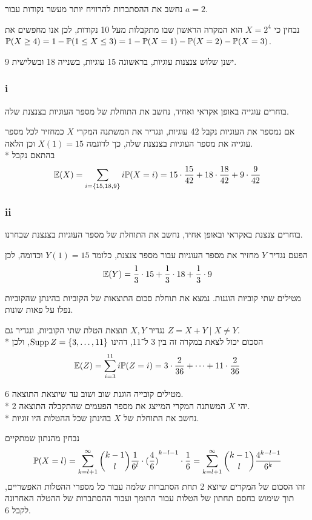 \subquestion{}
נחשב את ההסתברות להרוויח יותר מעשר נקודות עבור $a = 2$.
\begin{solution}
	נבחין כי $X = 2^4$ הוא המקרה הראשון שבו מתקבלות מעל 10 נקודות, לכן אנו מחפשים את $\mathbb{P}(X \ge 4) = 1 - \mathbb{P}(1 \le X \le 3) = 1 - \mathbb{P}(X = 1) - \mathbb{P}(X = 2) - \mathbb{P}(X = 3)$.
\end{solution}

\question{}
\subquestion{}
ישנן שלוש צנצנות עוגיות, בראשונה 15 עוגיות, בשנייה 18 ובשלישית 9.

\subsubsection{i}
בוחרים עוגייה באופן אקראי ואחיד, נחשב את התוחלת של מספר העוגיות בצנצנת שלה.
\begin{solution}
	אם נמספר את העוגיות נקבל 42 עוגיות, ונגדיר את המשתנה המקרי $X$ כמחזיר לכל מספר עוגייה את מספר העוגיות בצנצנת שלה, כך לדוגמה $X(1) = 15$ וכן הלאה. \\*
	בהתאם נקבל
	\[
		\mathbb{E}(X)
		= \sum_{i = \{15, 18, 9\}} i \mathbb{P}(X = i)
		= 15 \cdot \frac{15}{42} + 18 \cdot \frac{18}{42} + 9 \cdot \frac{9}{42}
	\]
\end{solution}

\subsubsection{ii}
בוחרים צנצנת באקראי ובאופן אחיד, נחשב את התוחלת של מספר העוגיות בצנצנת שבחרנו.
\begin{solution}
	הפעם נגדיר $Y$ מחזיר את מספר העוגיות עבור מספר צנצנת, כלומר $Y(1) = 15$ וכדומה, לכן
	\[
		\mathbb{E}(Y) = \frac{1}{3} \cdot 15 + \frac{1}{3} \cdot 18 + \frac{1}{3} \cdot 9
	\]
\end{solution}

\subquestion{}
מטילים שתי קוביות הוגנות.
נמצא את תוחלת סכום התוצאות של הקוביות בהינתן שהקוביות נפלו על פאות שונות.
\begin{solution}
	נגדיר $X, Y$ תוצאת הטלת שתי הקוביות, ונגדיר גם $Z = X + Y \mid X \ne Y$. \\*
	הסכום יכול לצאת במקרה זה בין 3 ל־11, דהינו $\operatorname{Supp} Z = \{3, \dots, 11\}$, ולכן
	\[
		\mathbb{E}(Z)
		= \sum_{i = 3}^{11} i \mathbb{P}(Z = i)
		= 3 \cdot \frac{2}{36} + \cdots + 11 \cdot \frac{2}{36}
	\]
\end{solution}

\subquestion{}
מטילים קובייה הוגנת שוב ושוב עד שיוצאת התוצאה 6. \\*
יהי $X$ המשתנה המקרי המייצג את מספר הפעמים שהתקבלה התוצאה 2. \\*
נחשב את התוחלת של $X$ בהינתן שכל ההטלות היו זוגיות.
\begin{solution}
	נבחין מהנתון שמתקיים
	\[
		\mathbb{P}(X = l)
		= \sum_{k = l + 1}^{\infty} \binom{k - 1}{l} \frac{1}{6^{l}} \cdot {(\frac{4}{6})}^{k - l - 1} \cdot \frac{1}{6}
		= \sum_{k = l + 1}^{\infty} \binom{k - 1}{l} \frac{4^{k - l - 1}}{6^k}
	\]
	זהו הסכום של המקרים שיוצא 2 תחת הסתברות שלמה עבור כל מספרי ההטלות האפשריים, תוך שימוש בחסם תחתון של הטלות עבור התומך ועבור ההסתברות של ההטלה האחרונה לקבל 6.
\end{solution}


